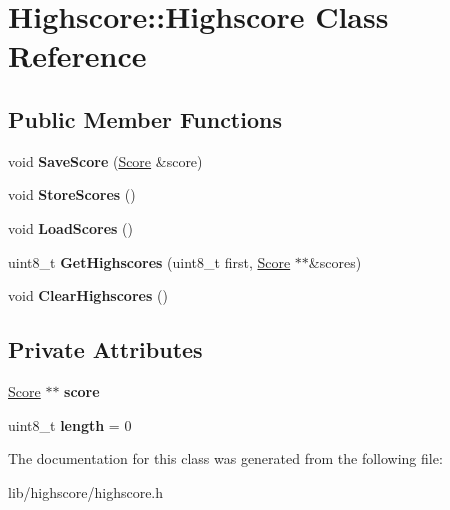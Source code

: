 \hypertarget{class_highscore_1_1_highscore}{\section{Highscore\-:\-:Highscore Class Reference}
\label{class_highscore_1_1_highscore}
}
\subsection*{Public Member Functions}
\begin{DoxyCompactItemize}
\item 
\hypertarget{class_highscore_1_1_highscore_ae19e8a6c55b49d6dd874b61ef496dcea}{void {\bfseries Save\-Score} (\hyperlink{struct_highscore_1_1_score}{Score} \&score)}\label{class_highscore_1_1_highscore_ae19e8a6c55b49d6dd874b61ef496dcea}

\item 
\hypertarget{class_highscore_1_1_highscore_ad0e1b3277228a38513b5c86059ebcd6d}{void {\bfseries Store\-Scores} ()}\label{class_highscore_1_1_highscore_ad0e1b3277228a38513b5c86059ebcd6d}

\item 
\hypertarget{class_highscore_1_1_highscore_acaba923c4f4acb3c174fb5e325f1bc5e}{void {\bfseries Load\-Scores} ()}\label{class_highscore_1_1_highscore_acaba923c4f4acb3c174fb5e325f1bc5e}

\item 
\hypertarget{class_highscore_1_1_highscore_af863b0108cf33796e96efa6d0ba613a1}{uint8\-\_\-t {\bfseries Get\-Highscores} (uint8\-\_\-t first, \hyperlink{struct_highscore_1_1_score}{Score} $\ast$$\ast$\&scores)}\label{class_highscore_1_1_highscore_af863b0108cf33796e96efa6d0ba613a1}

\item 
\hypertarget{class_highscore_1_1_highscore_ad2d0f11408e3d47c7b8434a71212f6c2}{void {\bfseries Clear\-Highscores} ()}\label{class_highscore_1_1_highscore_ad2d0f11408e3d47c7b8434a71212f6c2}

\end{DoxyCompactItemize}
\subsection*{Private Attributes}
\begin{DoxyCompactItemize}
\item 
\hypertarget{class_highscore_1_1_highscore_a569a403dc24a8fa67efd7065148f4c9d}{\hyperlink{struct_highscore_1_1_score}{Score} $\ast$$\ast$ {\bfseries score}}\label{class_highscore_1_1_highscore_a569a403dc24a8fa67efd7065148f4c9d}

\item 
\hypertarget{class_highscore_1_1_highscore_a18a119eae9c24ab69477411b9bf45867}{uint8\-\_\-t {\bfseries length} = 0}\label{class_highscore_1_1_highscore_a18a119eae9c24ab69477411b9bf45867}

\end{DoxyCompactItemize}


The documentation for this class was generated from the following file\-:\begin{DoxyCompactItemize}
\item 
lib/highscore/highscore.\-h\end{DoxyCompactItemize}
